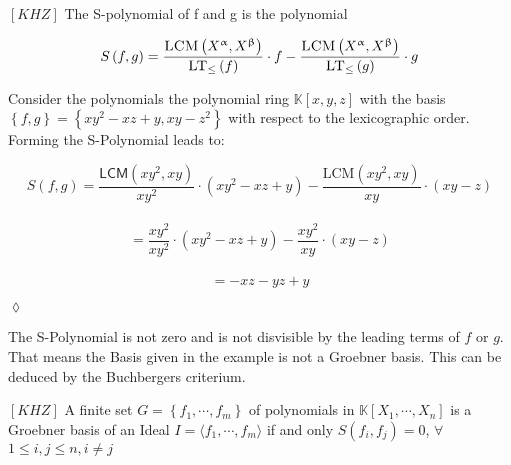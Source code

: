 \begin{env_definition}[S-Polynomial]
$\left[ KHZ\right] $ The S-polynomial of f and g is the polynomial
\begin{center}
\[ S\left( f,g\right) = \frac{\textsc{LCM}\left( X^{\upalpha}, X^{\upbeta}\right) }{\textsc{LT}_{\leq}\left( f\right) } \cdot f - \frac{ \textsc{LCM}\left( X^{\upalpha}, X^{\upbeta}\right) }{\textsc{LT}_{\leq}\left( g\right) } 
\cdot g \]
\end{center}

\end{env_definition}

\begin{env_example}\normalfont
Consider the polynomials the polynomial ring $\mathbb{K}\left[ x,y,z\right] $ with
the basis $\left\lbrace f,g\right\rbrace = \left\lbrace xy^{2}-xz+y,xy-z^{2} \right\rbrace $ with respect to the lexicographic order.\\
Forming the S-Polynomial leads to:
\begin{center}
\[
 S\left( f,g\right) = \frac{\textsf{LCM}\left( xy^{2}, xy \right) } {xy^{2} } \cdot \left(  xy^{2}-xz+y\right) - \frac{\textrm{LCM}\left( xy^{2}, xy \right) } {xy } \cdot \left( xy-z \right)   
 \]  \\
 \[ = \frac{xy^{2}}{xy^{2}} \cdot \left( xy^{2}-xz+y\right) - \frac{xy^{2}}{xy} \cdot \left( xy-z\right)   \] \\
 \[ = -xz-yz+y  \]


\end{center}

\begin{flushright}
$\lozenge$
\end{flushright} 
\end{env_example}

The S-Polynomial is not zero and is not disvisible by the leading terms of $f$ or $g$. That means the Basis given in the example is not a Groebner basis. This can be deduced by the Buchbergers criterium.

\begin{env_definition}
$\left[ KHZ\right] $ A finite set $G = \left\lbrace f_{1}, \cdots , f_{m} \right\rbrace$ of polynomials in $ \mathbb{K}\left[X_{1}, \cdots, X_{n}\right] $ is a Groebner basis of an Ideal 
$I = \langle f_{1}, \cdots , f_{m} \rangle $ if and only $S\left( f_{i},f_{j}\right) = 0$, $ \forall$  $1 \leq i,j \leq n, i\neq j $

\end{env_definition}

